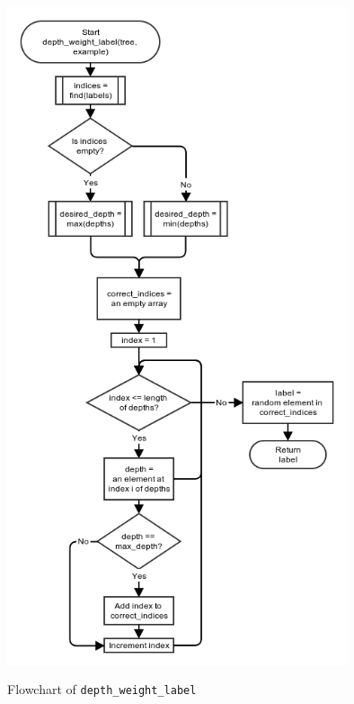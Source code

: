 \documentclass[10pt,a4paper]{article}
\begin{document}
\begin{figure}[!ht]
	\centering
	\includegraphics[height=20cm, width=10cm]{images/flow_chart/depth_weight_label.png}
	\caption{Flowchart of \tt{depth\_weight\_label}}
	\label{fig:depth_weight_label}
\end{figure}
\end{document}
